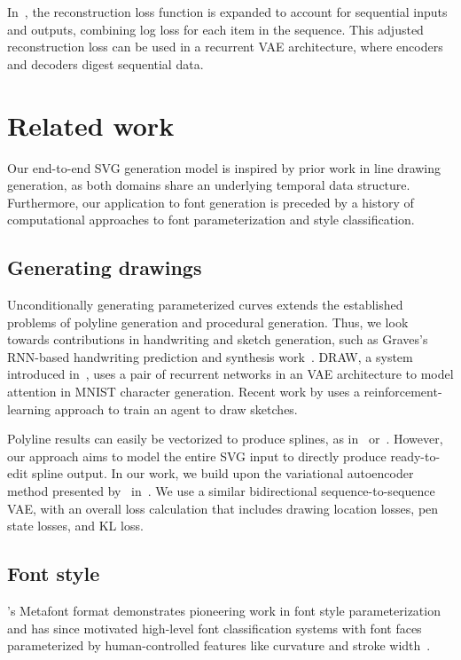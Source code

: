 In~\cite{graves2013generating}, the reconstruction loss function is expanded to account for sequential inputs and outputs, combining log loss for each item in the sequence.
This adjusted reconstruction loss can be used in a recurrent VAE architecture, where encoders and decoders digest sequential data.

\section{Related work}
Our end-to-end SVG generation model is inspired by prior work in line drawing generation, as both domains share an underlying temporal data structure.
Furthermore, our application to font generation is preceded by a history of computational approaches to font parameterization and style classification.

\subsection{Generating drawings}
Unconditionally generating parameterized curves extends the established problems of polyline generation and procedural generation.
Thus, we look towards contributions in handwriting and sketch generation, such as Graves's RNN-based handwriting prediction and synthesis work~\cite{graves2013generating}.
DRAW, a system introduced in~\cite{gregor2015draw}, uses a pair of recurrent networks in an VAE architecture to model attention in MNIST character generation.
Recent work by \citeauthor{ganin2017synthesizing} uses a reinforcement-learning approach to train an agent to draw sketches.

Polyline results can easily be vectorized to produce splines, as in~\cite{janssen1997adaptive} or~\cite{birdal2014novel}.
However, our approach aims to model the entire SVG input to directly produce ready-to-edit spline output.
In our work, we build upon the variational autoencoder method presented by~\citeauthor{ha2017neural} in~\cite{ha2017neural}.
We use a similar bidirectional sequence-to-sequence VAE, with an overall loss calculation that includes drawing location losses, pen state losses, and KL loss.

\subsection{Font style}
\citeauthor{knuth1979tex}'s Metafont format demonstrates pioneering work in font style parameterization and has since motivated high-level font classification systems with font faces parameterized by human-controlled features like curvature and stroke width~\cite{knuth1979tex}\cite{lau2009learning}\cite{hassan2010next}.

